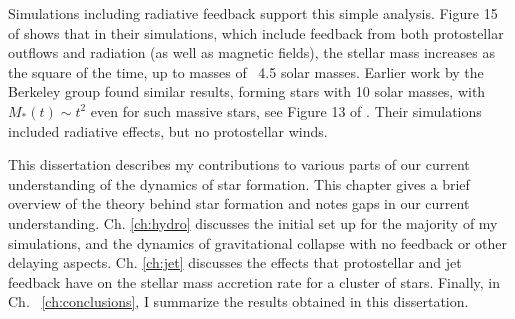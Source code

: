 \documentclass[../dissertation.tex]{subfiles}
\begin{document}
Simulations including radiative feedback support this simple analysis. Figure 15 of  \citet{2014MNRAS.439.3420M} shows that in their simulations, which include feedback from both protostellar outflows and radiation (as well as magnetic fields), the stellar mass increases as the square of the time, up to masses of ~4.5 solar masses. Earlier work by the Berkeley group found similar results, forming stars with 10 solar masses, with $M_*(t)\sim t^2$ even for such massive stars, see Figure 13 of \citet{2012ApJ...754...71K}. Their simulations included radiative effects, but no protostellar winds. 


This dissertation describes my contributions to various parts of our current understanding of the dynamics of star formation. 
This chapter gives a brief overview of the theory behind star formation and notes gaps in our current understanding. 
Ch. \ref{ch:hydro} discusses the initial set up for the majority of my simulations, and the dynamics of gravitational collapse with no feedback or other delaying aspects.
Ch. \ref{ch:jet} discusses the effects that protostellar and jet feedback have on the stellar mass accretion rate for a cluster of stars.
Finally, in Ch. ~\ref{ch:conclusions}, I summarize the results obtained in this dissertation.
\end{document}
